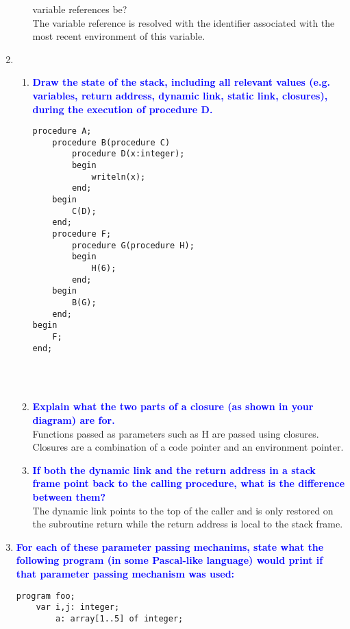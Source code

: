 \documentclass[11pt]{article}
\begin{document}
\begin{enumerate}
\begin{enumerate}
{{    variable references be?}}
        \\ The variable reference is resolved with the identifier associated with the most recent environment of this variable. 
    \end{enumerate}
\item 
    \begin{enumerate}
    \item \textbf{\textcolor{blue}{Draw the state of the stack, including all relevant values (e.g. variables, return address,
    dynamic link, static link, closures), during the execution of procedure D.}}
        \begin{verbatim}
procedure A;
    procedure B(procedure C)
        procedure D(x:integer);
        begin
            writeln(x);
        end;
    begin
        C(D);
    end;
    procedure F;
        procedure G(procedure H);
        begin
            H(6);
        end;
    begin
        B(G);
    end;
begin
    F;
end;
        \end{verbatim}
        \\\\
        \begin{drawstack}
        \end{drawstack}
    \item \textbf{\textcolor{blue}{Explain what the two parts of a closure (as shown in your diagram) are for.}}
        \\ Functions passed as parameters such as H are passed using closures. Closures are a combination of a code pointer and an environment pointer.
    \item \textbf{\textcolor{blue}{If both the dynamic link and the return address in a stack frame point back to the calling procedure, what is the difference between them?}}
        \\ The dynamic link points to the top of the caller and is only restored on the subroutine return while the return address is local to the stack frame.
    \end{enumerate}
\item \textbf{\textcolor{blue}{For each of these parameter passing mechanims, state what the following program (in some Pascal-like language) would print if that parameter passing mechanism was used:}}
\begin{verbatim}
program foo;
    var i,j: integer;
        a: array[1..5] of integer;

\end{verbatim}
\end{enumerate}
\end{document}
